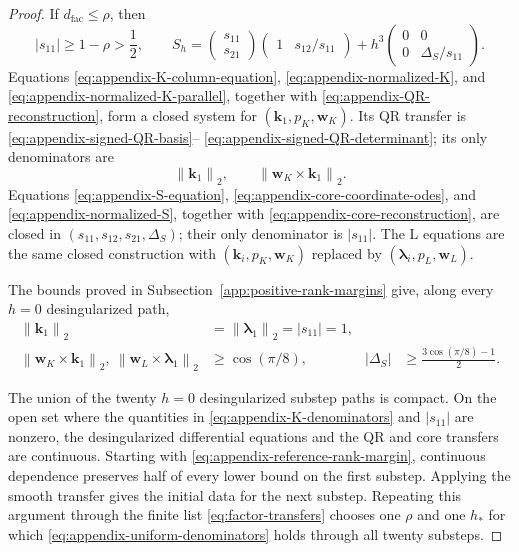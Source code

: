 \documentclass[10pt,a4paper]{amsart}
\numberwithin{equation}{section}
\newcommand{\norm}[1]{\left\lVert #1\right\rVert}
\begin{document}
\begin{proof}
If \(d_{\mathrm{fac}}\le\rho\), then
\begin{equation}\label{eq:appendix-s11-lower-bound}
 |s_{11}|\ge1-\rho>\frac12,
 \qquad
 S_h=
 \begin{pmatrix}s_{11}\\s_{21}\end{pmatrix}
 \begin{pmatrix}1&s_{12}/s_{11}\end{pmatrix}
 +h^3\begin{pmatrix}0&0\\0&\Delta_S/s_{11}\end{pmatrix}.
\end{equation}
Equations \eqref{eq:appendix-K-column-equation},
\eqref{eq:appendix-normalized-K}, and
\eqref{eq:appendix-normalized-K-parallel}, together with
\eqref{eq:appendix-QR-reconstruction}, form a closed system for
\((\boldsymbol k_1,p_K,\boldsymbol w_K)\).  Its QR transfer is
\eqref{eq:appendix-signed-QR-basis}--
\eqref{eq:appendix-signed-QR-determinant}; its only denominators are
\begin{equation}\label{eq:appendix-K-denominators}
 \norm{\boldsymbol k_1}_2,
 \qquad
 \norm{\boldsymbol w_K\times\boldsymbol k_1}_2.
\end{equation}
Equations \eqref{eq:appendix-S-equation},
\eqref{eq:appendix-core-coordinate-odes}, and
\eqref{eq:appendix-normalized-S}, together with
\eqref{eq:appendix-core-reconstruction}, are closed in
\((s_{11},s_{12},s_{21},\Delta_S)\); their only denominator is
\(|s_{11}|\).  The L equations are the same closed construction with
\((\boldsymbol k_i,p_K,\boldsymbol w_K)\) replaced by
\((\boldsymbol\lambda_i,p_L,\boldsymbol w_L)\).

The bounds proved in Subsection~\ref{app:positive-rank-margins} give,
along every $h=0$ desingularized path,
\begin{equation}\label{eq:appendix-reference-rank-margin}
\begin{aligned}
 \norm{\boldsymbol k_1}_2
 &=\norm{\boldsymbol\lambda_1}_2=|s_{11}|=1,\\
 \norm{\boldsymbol w_K\times\boldsymbol k_1}_2,
 \ \norm{\boldsymbol w_L\times\boldsymbol\lambda_1}_2
 &\ge\cos(\pi/8),
 &|\Delta_S|&\ge\frac{3\cos(\pi/8)-1}{2}.
\end{aligned}
\end{equation}

The union of the twenty $h=0$ desingularized substep paths is compact.  On the open
set where the quantities in \eqref{eq:appendix-K-denominators} and
\(|s_{11}|\) are nonzero, the desingularized differential equations
and the QR and core transfers are continuous.  Starting with
\eqref{eq:appendix-reference-rank-margin}, continuous dependence
preserves half of every lower bound on the first substep.  Applying the
smooth transfer gives the initial data for the next substep.  Repeating
this argument through the finite list \eqref{eq:factor-transfers}
chooses one \(\rho\) and one \(h_*\) for which
\eqref{eq:appendix-uniform-denominators} holds through all twenty
substeps.


\end{proof}
\end{document}
